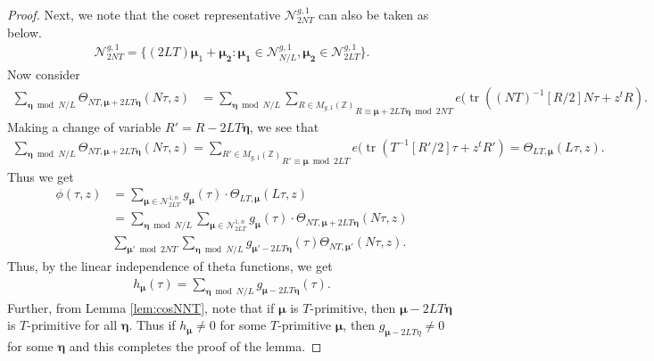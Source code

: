 \documentclass[11pt]{amsart}
\numberwithin{equation}{section}
\newcommand{\mc}{\mathcal}
\DeclareMathOperator{\tr}{tr}
\newcommand{\z}{\mathbb{Z}}
\newcommand{\sumn}{\sum \nolimits}
\begin{document}
\begin{proof}
Next, we note that the coset representative $\mc N_{2NT}^{g,1}$ can also be taken as below.
\begin{align}
 \mc N_{2NT}^{g,1}=\{(2LT){\bm\mu_1}+\bm{\mu_2}: \bm{\mu_1} \in  \mc N_{N/L}^{g,1}, \bm{\mu_2} \in \mc N_{2LT}^{g,1} \}. 
\end{align}
Now consider 
\begin{align}
    \sum_{\bm\eta\bmod N/L}\Theta_{NT, \bm\mu+2LT\bm\eta}(N\tau, z)&=\sum_{\bm\eta\bmod N/L}\underset{R\equiv \bm\mu+2LT\bm\eta\bmod 2NT}{\sum_{R\in M_{g,1}(\z)}}
e(\tr( (NT)^{-1}[R/2]N\tau+z^tR).
\end{align}
Making a change of variable $R'=R-2LT\bm\eta$, we see that
\begin{align}
 \sum_{\bm\eta\bmod N/L}\Theta_{NT, \bm\mu+2LT\bm\eta}(N\tau, z)=\underset{R'\equiv \bm\mu\bmod  2LT}{\sum_{R'\in M_{g,1}(\z)}}
e(\tr( T^{-1}[R'/2]\tau+z^tR')=\Theta_{LT, \bm\mu}(L\tau, z).
\end{align}
Thus we get
\begin{align}
\phi(\tau, z)&=\sumn_{\bm\mu\in \mc N_{2LT}^{1,n}} g_{\bm\mu}(\tau)\cdot \Theta_{LT, \bm\mu}(L\tau,z)\\
&=\sumn_{\bm\eta\bmod N/L}\sumn_{\bm\mu\in \mc N_{2LT}^{1,n}} g_{\bm\mu}(\tau)\cdot \Theta_{NT, \bm\mu+2LT\bm\eta}(N\tau,z)\\
&\sumn_{\bm\mu'\bmod 2NT}\sumn_{\bm\eta\bmod N/L}g_{\bm\mu'-2LT\bm\eta}(\tau)\Theta_{NT, \bm\mu'}(N\tau,z).
\end{align}
Thus, by the linear independence of theta functions, we get
\begin{align}
    h_{\bm\mu}(\tau)=\sumn_{\bm\eta\bmod N/L}g_{\bm\mu-2LT\bm\eta}(\tau).
\end{align}
Further, from Lemma \ref{lem:cosNNT}, note that if $\bm\mu$ is $T$-primitive, then $\bm\mu-2LT\bm\eta$ is $T$-primitive for all $\bm\eta$. Thus if $h_{\bm\mu}\neq 0$ for some $T$-primitive $\bm\mu$, then $g_{\bm\mu-2LT\eta}\neq 0$ for some $\bm\eta$ and this completes the proof of the lemma.
\end{proof}
\end{document}
